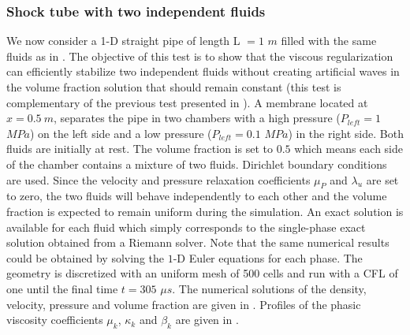 \documentclass[preprint,10pt]{elsarticle}
\begin{document}
\subsubsection{Shock tube with two independent fluids}\label{sec:shock-tube-two-indep-fluids}
%
We now consider a 1-D straight pipe of length L $=1$ $m$ filled with the same fluids as in . The objective of this test is to show that 
the viscous regularization can efficiently stabilize two independent fluids without creating artificial waves in the volume fraction solution that should remain 
constant (this test is complementary of the previous test presented in ). A membrane located at $x=0.5 \ m$, separates the pipe in two chambers with a high pressure ($P_{left} = 1$ $MPa$) on the left side and a low pressure ($P_{left} = 0.1$ 
$MPa$) in the right side. Both fluids are initially at rest. The volume fraction is set to $0.5$ which means each side of the chamber contains a mixture of two 
fluids. Dirichlet boundary conditions are used. Since the velocity and pressure relaxation coefficients $\mu_P$ and $\lambda_u$ are set to zero, the two 
fluids will behave independently to each other and the volume fraction is expected to remain uniform during the simulation. An exact solution is available for 
each fluid which simply corresponds to the single-phase exact solution obtained from a Riemann solver. Note that the same numerical results could be obtained by solving the $1$-D Euler equations for each phase. The geometry is discretized with an uniform mesh of 
500 cells and run with a CFL of one until the final time $t = 305$ $\mu s$. The numerical solutions of the density, velocity, pressure and volume fraction are given in . Profiles of the phasic viscosity coefficients $\mu_k$, $\kappa_k$ and $\beta_k$ are given in .
%
\end{document}
